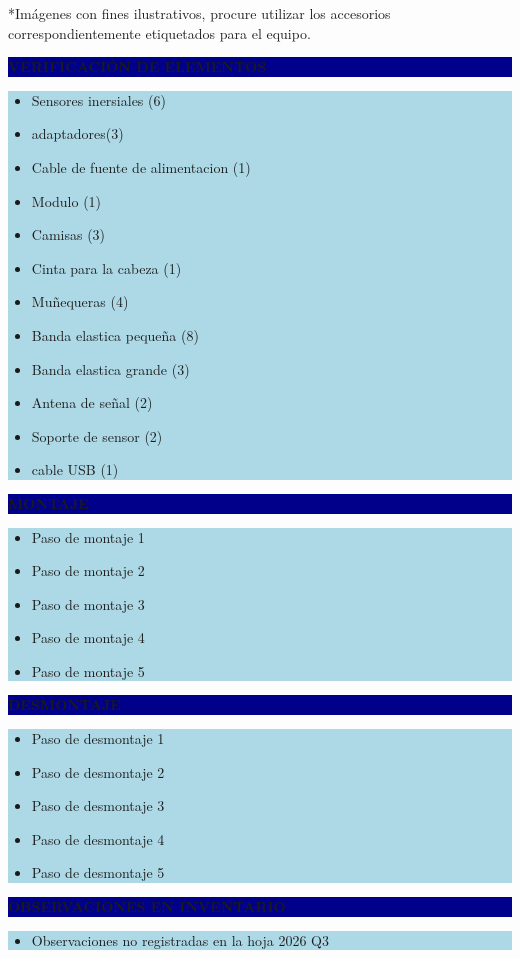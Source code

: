 \documentclass[11pt]{article}
\newcommand{\seccionbanda}[1]{%
  \vspace{0.6em}
  \noindent\colorbox{darkblue}{\parbox{\dimexpr\linewidth-2\fboxsep}{%
    \centering\color{white}\bfseries #1}}\par\vspace{0.6em}
}
\begin{document}
\vspace{0.5em}
\footnotesize{*Imágenes con fines ilustrativos, procure utilizar los accesorios correspondientemente etiquetados para el equipo.}
\normalsize

\newpage
\seccionbanda{VERIFICACIÓN DE ELEMENTOS}
\noindent\colorbox{lightblue}{\parbox{\dimexpr\linewidth-2\fboxsep\relax}{%
\begin{itemize}[label=$\square$, itemsep=4pt]
\item Sensores inersiales (6)
\item adaptadores(3)
\item Cable de fuente de alimentacion (1)
\item Modulo (1)
\item Camisas (3)
\item Cinta para la cabeza (1)
\item Muñequeras (4)
\item Banda elastica pequeña (8)
\item Banda elastica grande (3)
\item Antena de señal (2)
\item Soporte de sensor (2)
\item cable USB (1)
\end{itemize}
}}\par

\seccionbanda{MONTAJE}
\noindent\colorbox{lightblue}{\parbox{\dimexpr\linewidth-2\fboxsep\relax}{%
\begin{itemize}[label=$\square$, itemsep=4pt]
\item Paso de montaje 1
\item Paso de montaje 2
\item Paso de montaje 3
\item Paso de montaje 4
\item Paso de montaje 5
\end{itemize}
}}\par

\seccionbanda{DESMONTAJE}
\noindent\colorbox{lightblue}{\parbox{\dimexpr\linewidth-2\fboxsep\relax}{%
\begin{itemize}[label=$\square$, itemsep=4pt]
\item Paso de desmontaje 1
\item Paso de desmontaje 2
\item Paso de desmontaje 3
\item Paso de desmontaje 4
\item Paso de desmontaje 5
\end{itemize}
}}\par
\seccionbanda{OBSERVACIONES EN INVENTARIO}
\noindent\colorbox{lightblue}{\parbox{\dimexpr\linewidth-2\fboxsep\relax}{\begin{itemize}[itemsep=4pt]
\item Observaciones no registradas en la hoja 2026 Q3
\end{itemize}}}\par
\end{document}
